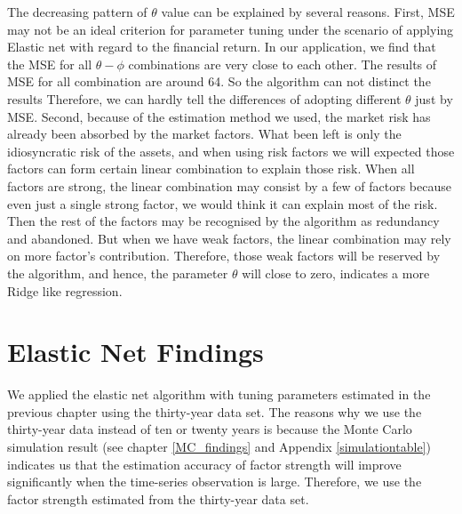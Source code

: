 The decreasing pattern of $\theta$ value can be explained by several reasons.
First, MSE may not be an ideal criterion for parameter tuning under the scenario of applying Elastic net with regard to the financial return. 
In our application, we find that the MSE for all $\theta - \phi$ combinations are very close to each other.
The results of MSE for all combination are around 64.
So the algorithm can not distinct the results 
Therefore, we can hardly tell the differences of adopting different $\theta$ just by MSE.
Second, because of the estimation method we used, the market risk has already been absorbed by the market factors.
What been left is only the idiosyncratic risk of the assets, and when using risk factors we will expected those factors can form certain linear combination to  explain those risk.
When all factors are strong, the linear combination may consist by a few of factors because even just a single strong factor, we would think it can explain most of the risk.
Then the rest of the factors may be recognised by the algorithm as redundancy and abandoned.
But when we have weak factors, the linear combination may rely on more factor's contribution.
Therefore, those weak factors will be reserved by the algorithm, and hence, the parameter $\theta$ will close to zero, indicates a more Ridge like regression.





\section{Elastic Net Findings}
We applied the elastic net algorithm with tuning parameters estimated in the previous chapter using the thirty-year data set.
The reasons why we use the thirty-year data instead of ten or twenty years is because the Monte Carlo simulation result (see chapter \ref{MC_findings} and Appendix \ref{simulationtable}) indicates us that the estimation accuracy of factor strength will improve significantly when the time-series observation is large.
Therefore, we use the factor strength estimated from the thirty-year data set.

